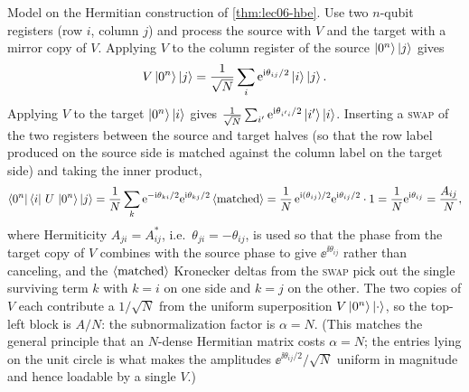 \begin{solution}
Model on the Hermitian construction of \cref{thm:lec06-hbe}. Use two $n$-qubit
registers (row $i$, column $j$) and process the source with $V$ and the target with a
mirror copy of $V$. Applying $V$ to the column register of the source
$\ket{0^n}\ket{j}$ gives
\[
  V\ket{0^n}\ket{j}=\frac1{\sqrt N}\sum_i\mathrm{e}^{\mathrm{i}\theta_{ij}/2}\ket i\ket j .
\]
Applying $V$ to the target $\ket{0^n}\ket{i}$ gives
$\frac1{\sqrt N}\sum_{i'}\mathrm{e}^{\mathrm{i}\theta_{i'i}/2}\ket{i'}\ket i$. Inserting a
\textsc{swap} of the two registers between the source and target halves (so that the
row label produced on the source side is matched against the column label on the
target side) and taking the inner product,
\[
  \bra{0^n}\bra i\,U\,\ket{0^n}\ket j
  =\frac1N\sum_{k}\mathrm{e}^{-\mathrm{i}\theta_{ki}/2}\mathrm{e}^{\mathrm{i}\theta_{kj}/2}
   \braket{\text{matched}}
  =\frac1N\,\mathrm{e}^{\mathrm{i}(\theta_{ij})/2}\mathrm{e}^{\mathrm{i}\theta_{ij}/2}\cdot 1
  =\frac1N\mathrm{e}^{\mathrm{i}\theta_{ij}}=\frac{A_{ij}}{N},
\]
where Hermiticity $A_{ji}=A_{ij}^{\ast}$, i.e.\ $\theta_{ji}=-\theta_{ij}$, is used so
that the phase from the target copy of $V$ combines with the source phase to give
$\ee^{\ii\theta_{ij}}$ rather than canceling, and the $\braket{\text{matched}}$
Kronecker deltas from the \textsc{swap} pick out the single surviving term $k$ with
$k=i$ on one side and $k=j$ on the other. The two copies of $V$ each contribute a
$1/\sqrt N$ from the uniform superposition $V\ket{0^n}\ket\cdot$, so the top-left block
is $A/N$: the subnormalization factor is $\alpha=N$. (This matches the general
principle that an $N$-dense Hermitian matrix costs $\alpha=N$; the entries lying on
the unit circle is what makes the amplitudes $\ee^{\ii\theta_{ij}/2}/\sqrt N$ uniform
in magnitude and hence loadable by a single $V$.)
\end{solution}
